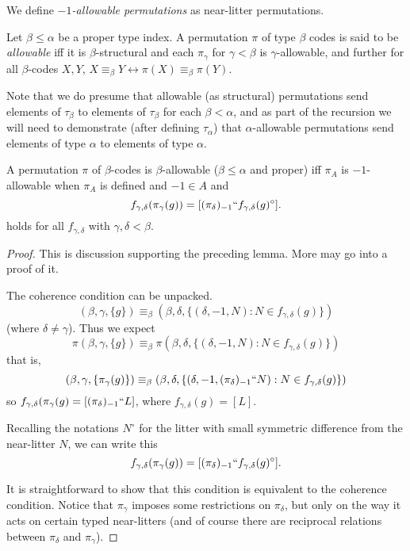 \begin{definition}
\label {def:allowable-perm}
We define {\em $-1$-allowable permutations} as near-litter permutations.

Let $\beta \leq \alpha$ be a proper type index.  A permutation $\pi$ of type $\beta$ codes is said to be
{\em allowable\/} iff it is $\beta$-structural and each $\pi_\gamma$ for $\gamma<\beta$ is $\gamma$-allowable, and further for all $\beta$-codes $X,Y$, $X \equiv_\beta Y \leftrightarrow \pi(X) \equiv_\beta \pi(Y)$.

Note that we do presume that allowable (as structural) permutations send elements of $\tau_\beta$ to elements of
$\tau_\beta$ for each $\beta<\alpha$, and as part of the recursion we will need to demonstrate (after defining $\tau_\alpha$) that $\alpha$-allowable permutations send elements of type $\alpha$ to elements of type $\alpha$.
\end{definition}

\begin{lemma}
\label {lem:coherence-unpacked}
A permutation $\pi$ of $\beta$-codes is $\beta$-allowable ($\beta \leq \alpha$ and proper) iff $\pi_A$ is $-1$-allowable when $\pi_A$ is defined and $-1 \in A$
and  $$f_{\gamma,\delta}(\pi_\gamma(g)) = [(\pi_\delta)_{-1}``f_{\gamma,\delta}(g)^\circ].$$
holds for all $f_{\gamma,\delta}$ with $\gamma,\delta<\beta$.
\end{lemma}

\begin{proof}
This is discussion supporting the preceding lemma.  More may go into a proof of it.

The coherence condition can be unpacked.
$$(\beta,\gamma,\{g\}) \equiv_\beta (\beta,\delta,\{(\delta,-1,N):N \in f_{\gamma,\delta}(g)\})$$(where $\delta\neq \gamma$).  Thus we expect
$$\pi(\beta,\gamma,\{g\}) \equiv_\beta \pi(\beta,\delta,\{(\delta,-1,N):N \in f_{\gamma,\delta}(g)\})$$
that is,
$$(\beta,\gamma,\{\pi_\gamma(g)\}) \equiv_\beta (\beta,\delta,\{(\delta,-1,(\pi_\delta)_{-1}``N):N \in f_{\gamma,\delta}(g)\})$$
so $f_{\gamma,\delta}(\pi_\gamma(g) = [(\pi_\delta)_{-1}``L]$, where $f_{\gamma,\delta}(g)=[L]$.

Recalling the notations $N^\circ$ for the litter with small symmetric difference from the near-litter $N$, we can write this $$f_{\gamma,\delta}(\pi_\gamma(g)) = [(\pi_\delta)_{-1}``f_{\gamma,\delta}(g)^\circ].$$

It is straightforward to show that this condition is equivalent to the coherence condition.  Notice that $\pi_\gamma$ imposes some restrictions on $\pi_\delta$, but only on the way it acts on certain typed near-litters (and of course there are reciprocal relations between $\pi_\delta$ and $\pi_\gamma$).
\end{proof}

